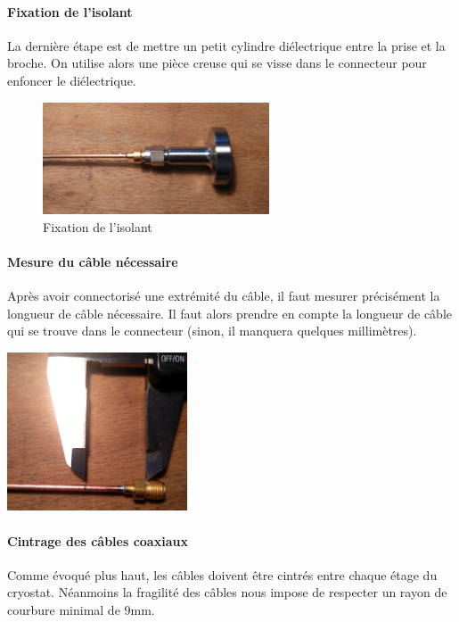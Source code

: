 \paragraph*{Fixation de l’isolant}  La dernière étape est de mettre un petit cylindre diélectrique entre la prise et la broche. On utilise alors une pièce creuse qui se visse dans le connecteur pour enfoncer le diélectrique.

\begin{figure}[ht]
    \begin{center}
        \includegraphics[width=0.60\textwidth]{Images/Coax/6}
        \caption{Fixation de l’isolant}
        \label{coax_fixation_isolant}
    \end{center}
\end{figure}

\paragraph*{Mesure du câble nécessaire} Après avoir connectorisé une extrémité du câble, il faut mesurer précisément la longueur de câble nécessaire. Il faut alors prendre en compte la longueur de câble qui se trouve dans le connecteur (sinon, il manquera quelques millimètres).

\begin{center}
    \includegraphics[width=0.40\textwidth]{Images/Coax/mesure}
    \label{coax_mesure}
\end{center}

\newpage
\paragraph*{Cintrage des câbles coaxiaux} Comme évoqué plus haut, les câbles doivent être cintrés entre chaque étage du cryostat. Néanmoins la fragilité des câbles nous impose de respecter un rayon de courbure minimal de 9mm.

